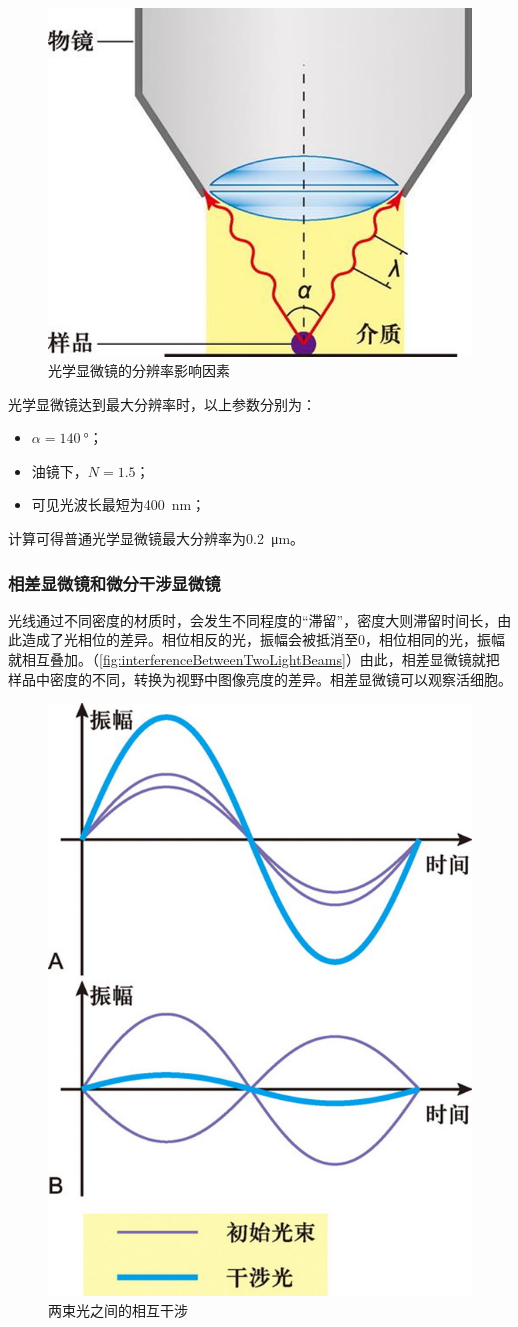 \begin{figure}[htbp]
	\centering
	\includegraphics[width=0.4\linewidth]{Pics/光学显微镜的分辨率影响因素}
	\caption{光学显微镜的分辨率影响因素}
	\label{fig:opticalMicroscopeResolutionInfluencingFactors}
\end{figure}

光学显微镜达到最大分辨率时，以上参数分别为：
\begin{itemize}
	\item $\alpha=\SI{140}{\degree}$；
	\item 油镜下，$N=1.5$；
	\item 可见光波长最短为\SI{400}{\nm}；
\end{itemize}

计算可得普通光学显微镜最大分辨率为\SI{0.2}{\um}。

\subsubsection{相差显微镜和微分干涉显微镜}

光线通过不同密度的材质时，会发生不同程度的“滞留”，密度大则滞留时间长，由此造成了光相位的差异。相位相反的光，振幅会被抵消至0，相位相同的光，振幅就相互叠加。（\autoref{fig:interferenceBetweenTwoLightBeams}）由此，相差显微镜就把样品中密度的不同，转换为视野中图像亮度的差异。相差显微镜可以观察活细胞。

\begin{figure}[htbp]
	\centering
	\includegraphics[width=0.4\linewidth]{Pics/两束光之间的相互干涉}
	\caption{两束光之间的相互干涉}
	\label{fig:interferenceBetweenTwoLightBeams}
\end{figure}

